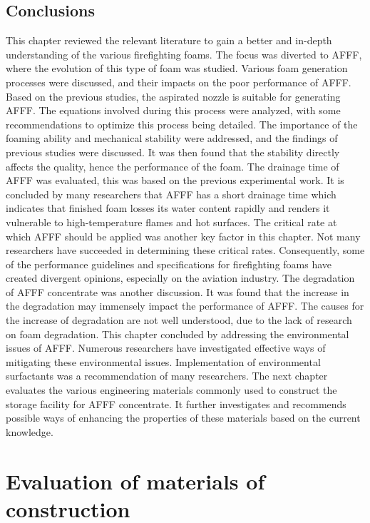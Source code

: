 \documentclass[12pt]{report}
\begin{document}
\section{Conclusions}
This chapter reviewed the relevant literature to gain a better and in-depth understanding of the various firefighting foams. The focus was diverted to AFFF, where the evolution of this type of foam was studied. Various foam generation processes were discussed, and their impacts on the poor performance of AFFF. Based on the previous studies, the aspirated nozzle is suitable for generating AFFF. The equations involved during this process were analyzed, with some recommendations to optimize this process being detailed. The importance of the foaming ability and mechanical stability were addressed, and the findings of previous studies were discussed. It was then found that the stability directly affects the quality, hence the performance of the foam.
The drainage time of AFFF was evaluated, this was based on the previous experimental work. It is concluded by many researchers that AFFF has a short drainage time which indicates that finished foam losses its water content rapidly and renders it vulnerable to high-temperature flames and hot surfaces.
The critical rate at which AFFF should be applied was another key factor in this chapter. Not many researchers have succeeded in determining these critical rates. Consequently, some of the performance guidelines and specifications for firefighting foams have created divergent opinions, especially on the aviation industry. The degradation of AFFF concentrate was another discussion. It was found that the increase in the degradation may immensely impact the performance of AFFF. The causes for the increase of degradation are not well understood, due to the lack of research on foam degradation. This chapter concluded by addressing the environmental issues of AFFF. Numerous researchers have investigated effective ways of mitigating these environmental issues. Implementation of environmental surfactants was a recommendation of many researchers.
The next chapter evaluates the various engineering materials commonly used to construct the storage facility for AFFF concentrate. It further investigates and recommends possible ways of enhancing the properties of these materials based on the current knowledge.

\chapter{Evaluation of materials of construction}
\end{document}
